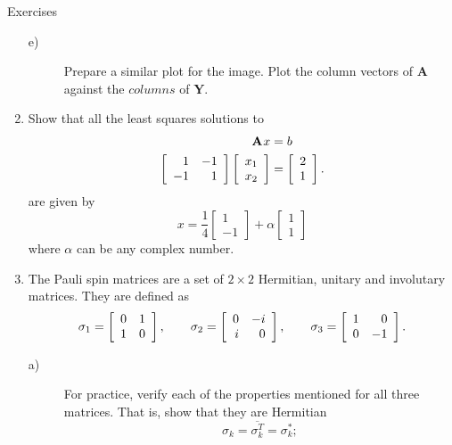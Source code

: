 \begin{xcb}{Exercises}
\begin{enumerate}
\begin{description}
  \item[e)] Prepare a similar plot for the image. Plot the column vectors of $ \textbf{A} $ against the $ columns $ of $ \textbf{Y} $.
\end{description}
\item Show that all the least squares solutions to
\begin{equation}
  \begin{split}
    \textbf{A}^{\mathrm{}} x & = b \\
 \left[
\begin{array}{ rr }
 1 & -1 \\
 -1 & 1 \\
\end{array}
\right]
\left[
\begin{array}{l}
 x_1 \\
 x_2
\end{array}
\right]
  & =
\left[
\begin{array}{l}
 2 \\
 1 \\
\end{array}
\right].
  \end{split}
\end{equation}
are given by 
\begin{equation}
  x = \frac{ 1 }{ 4 }
\left[
\begin{array}{ r }
 1 \\
 -1
\end{array}
\right]
  + \alpha
\left[
\begin{array}{l}
 1 \\
 1
\end{array}
\right]
\end{equation}
where $ \alpha $ can be any complex number.
\item The Pauli spin matrices are a set of $ 2 \times 2 $ Hermitian, unitary and involutary matrices. They are defined as
\begin{equation}
  \begin{split}
    \sigma_1 = \left[ \begin{array}{cc} 0 & 1 \\ 1 & 0 \end{array} \right], \qquad \sigma_2 = \left[ \begin{array}{rr} 0 & -i \\ i & 0 \end{array} \right], \qquad \sigma_3 = \left[ \begin{array}{rr} 1 & 0 \\ 0 & -1 \end{array} \right]. \\
  \end{split}
\end{equation}
\begin{description}
  \item[a)] For practice, verify each of the properties mentioned for all three matrices. That is, show that they are Hermitian
\begin{equation}
  \sigma_k = \overline{ \sigma_{k}^{T} } = \sigma_k^{ * };

\end{equation}
\end{description}
\end{enumerate}
\end{xcb}
